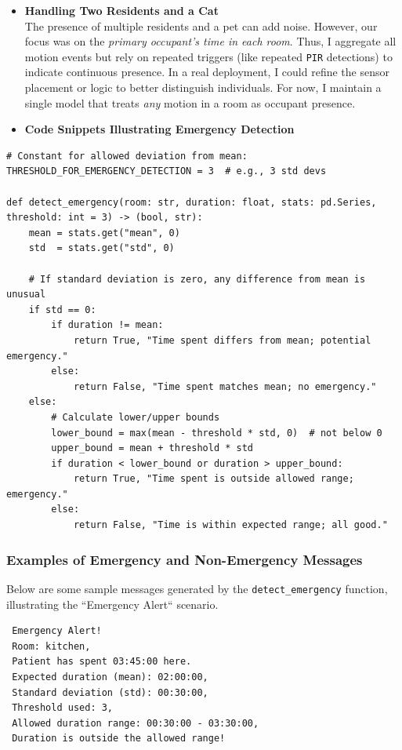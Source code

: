 \documentclass[A4,10pt]{article}
\begin{document}
\begin{itemize}
    \item \textbf{Handling Two Residents and a Cat} \\
    The presence of multiple residents and a pet can add noise. However, our focus was on the \emph{primary occupant’s time in each room}. Thus, I aggregate all motion events but rely on repeated triggers (like repeated \texttt{PIR} detections) to indicate continuous presence. In a real deployment, I could refine the sensor placement or logic to better distinguish individuals. For now, I maintain a single model that treats \textit{any} motion in a room as occupant presence.

    \item \textbf{Code Snippets Illustrating Emergency Detection}
\end{itemize}

\begin{verbatim}
# Constant for allowed deviation from mean:
THRESHOLD_FOR_EMERGENCY_DETECTION = 3  # e.g., 3 std devs

def detect_emergency(room: str, duration: float, stats: pd.Series, threshold: int = 3) -> (bool, str):
    mean = stats.get("mean", 0)
    std  = stats.get("std", 0)

    # If standard deviation is zero, any difference from mean is unusual
    if std == 0:
        if duration != mean:
            return True, "Time spent differs from mean; potential emergency."
        else:
            return False, "Time spent matches mean; no emergency."
    else:
        # Calculate lower/upper bounds
        lower_bound = max(mean - threshold * std, 0)  # not below 0
        upper_bound = mean + threshold * std
        if duration < lower_bound or duration > upper_bound:
            return True, "Time spent is outside allowed range; emergency."
        else:
            return False, "Time is within expected range; all good."
\end{verbatim}

\subsubsection*{Examples of Emergency and Non-Emergency Messages}

Below are some sample messages generated by the \texttt{detect\_emergency} function, illustrating the ``Emergency Alert`` scenario.

\begin{verbatim}
 Emergency Alert!
 Room: kitchen,
 Patient has spent 03:45:00 here.
 Expected duration (mean): 02:00:00,
 Standard deviation (std): 00:30:00,
 Threshold used: 3,
 Allowed duration range: 00:30:00 - 03:30:00,
 Duration is outside the allowed range!
\end{verbatim}
\end{document}
